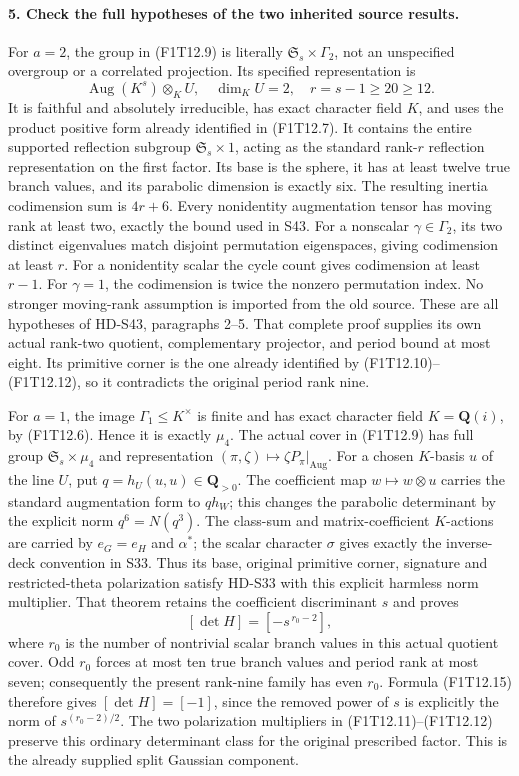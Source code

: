 \paragraph{5. Check the full hypotheses of the two inherited source results.}
For \(a=2\), the group in (F1T12.9) is literally
\(\mathfrak S_s\times\Gamma_2\), not an unspecified
overgroup or a correlated projection. Its specified
representation is
\[
 \operatorname{Aug}(K^s)\otimes_K U,\quad
 \dim_KU=2,\quad r=s-1\ge20\ge12.
 \tag{F1T12.14}
\]
It is faithful and absolutely irreducible, has exact
character field \(K\), and uses the product positive form
already identified in (F1T12.7). It contains the entire
supported reflection subgroup
\(\mathfrak S_s\times1\), acting as the standard
rank-\(r\) reflection representation on the first factor.
Its base is the sphere, it has at least twelve true
branch values, and its parabolic dimension is exactly six.
The resulting inertia codimension sum is \(4r+6\).
Every nonidentity augmentation tensor has moving rank at
least two, exactly the bound used in S43. For a nonscalar
\(\gamma\in\Gamma_2\), its two distinct eigenvalues match
disjoint permutation eigenspaces, giving codimension at
least \(r\). For a nonidentity scalar the cycle count gives
codimension at least \(r-1\). For \(\gamma=1\), the
codimension is twice the nonzero permutation index.
No stronger moving-rank assumption is imported from the old source.
These are all hypotheses of HD-S43, paragraphs 2--5.
That complete proof supplies its own actual rank-two
quotient, complementary projector, and period bound at
most eight. Its primitive corner is the one already
identified by (F1T12.10)--(F1T12.12), so it contradicts
the original period rank nine.

For \(a=1\), the image \(\Gamma_1\le K^\times\) is finite
and has exact character field \(K=\mathbf Q(i)\), by
(F1T12.6). Hence it is exactly \(\mu_4\).
The actual cover in (F1T12.9) has full group
\(\mathfrak S_s\times\mu_4\) and representation
\((\pi,\zeta)\mapsto\zeta P_\pi|_{\operatorname{Aug}}\).
For a chosen \(K\)-basis \(u\) of the line \(U\), put
\(q=h_U(u,u)\in\mathbf Q_{>0}\). The coefficient map
\(w\mapsto w\otimes u\) carries the standard augmentation
form to \(q h_W\); this changes the parabolic determinant
by the explicit norm \(q^6=N(q^3)\).
The class-sum and matrix-coefficient \(K\)-actions are carried
by \(e_G=e_H\) and \(\alpha^*\); the scalar character
\(\sigma\) gives exactly the inverse-deck convention in S33.
Thus its base, original primitive corner, signature and
restricted-theta polarization satisfy HD-S33 with this
explicit harmless norm multiplier.
That theorem retains the coefficient discriminant \(s\)
and proves
\[
                  [\det H]=[-s^{\,r_0-2}],
 \tag{F1T12.15}
\]
where \(r_0\) is the number of nontrivial scalar
branch values in this actual quotient cover.
Odd \(r_0\) forces at most ten true branch values and
period rank at most seven; consequently the present
rank-nine family has even \(r_0\). Formula (F1T12.15)
therefore gives \([\det H]=[-1]\), since the removed
power of \(s\) is explicitly the norm of
\(s^{(r_0-2)/2}\). The two polarization multipliers in
(F1T12.11)--(F1T12.12) preserve this ordinary determinant
class for the original prescribed factor. This is the
already supplied split Gaussian component.

